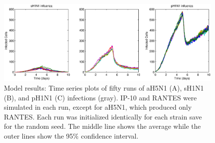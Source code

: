 \documentclass[10pt]{article}
\begin{document}
\begin{figure}[ht!]
\begin{center}
 \includegraphics[width=\textwidth]{variance}
 \end{center}
\caption{Model results: Time series plots of fifty runs of aH5N1 (A), sH1N1 (B), and pH1N1 (C) infections (gray). IP-10 and RANTES were simulated in each run, except for aH5N1, which  produced only RANTES.  Each run was initialized identically for each strain save for the random seed.  The middle line shows the average while the outer lines show the 95\% confidence interval.} 
 \label{fig:variance}
\end{figure}
\end{document}
